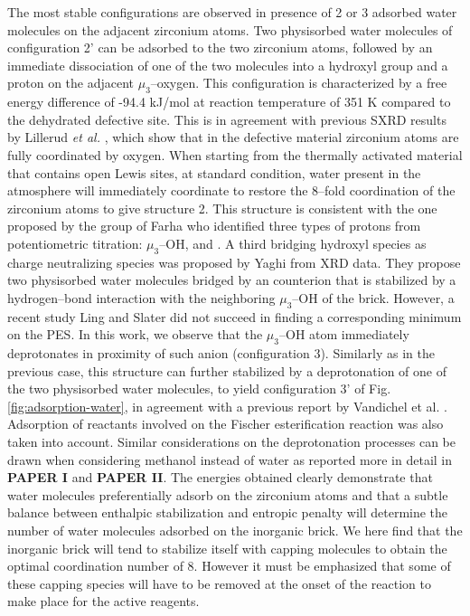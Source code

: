 The most stable configurations are observed in presence of 2 or 3 adsorbed water molecules on the adjacent zirconium atoms. Two physisorbed water molecules of configuration 2’ can be adsorbed to the two zirconium atoms, followed by an immediate dissociation of one of the two molecules into a hydroxyl group and a proton on the adjacent $\mu_3$--oxygen. This configuration is characterized by a free energy difference of -94.4 kJ/mol at reaction temperature of 351 K compared to the dehydrated defective site. This is in agreement with previous SXRD results by Lillerud \textit{et al.} \cite{oien2014detailed}, which show that in the defective material zirconium atoms are fully coordinated by oxygen. When starting from the thermally activated material that contains open Lewis sites, at standard condition, water present in the atmosphere will immediately coordinate to restore the 8--fold coordination of the zirconium atoms to give structure 2. This structure is consistent with the one proposed by the group of Farha \cite{klet2016evaluation} who identified three types of protons from potentiometric titration: $\mu_3$--OH,  and . 
\npar
A third bridging hydroxyl species as charge neutralizing species was proposed by Yaghi \cite{trickett2015definitive} from XRD data. They propose two physisorbed water molecules bridged by an  counterion that is stabilized by a hydrogen--bond interaction with the neighboring $\mu_3$--OH of the brick. However, a recent study Ling and Slater \cite{ling2016dynamic} did not succeed in finding a corresponding minimum on the PES. In this work, we observe that the $\mu_3$--OH atom immediately deprotonates in proximity of such  anion (configuration 3). Similarly as in the previous case, this structure can further stabilized by a deprotonation of one of the two physisorbed water molecules, to yield configuration 3’ of Fig. \ref{fig:adsorption-water}, in agreement with a previous report by Vandichel et al. \cite{vandichel2016water}. Adsorption of reactants involved on the Fischer esterification reaction was also taken into account. Similar considerations on the deprotonation processes can be drawn when considering methanol instead of water as reported more in detail in \textbf{PAPER I} and \textbf{PAPER II}. The energies obtained clearly demonstrate that water molecules preferentially adsorb on the zirconium atoms and that a subtle balance between enthalpic stabilization and entropic penalty will determine the number of water molecules adsorbed on the inorganic brick. We here find that the inorganic brick will tend to stabilize itself with capping molecules to obtain the optimal coordination number of 8. However it must be emphasized that some of these capping species will have to be removed at the onset of the reaction to make place for the active reagents.  

